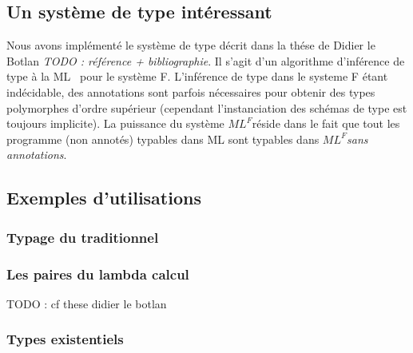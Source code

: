\documentclass[a4paper]{article}
\def\mlf{$ML^F$}
\begin{document}
\subsection{Un système de type intéressant}

Nous avons implémenté le système de type décrit dans la thése de
Didier le Botlan \textit{TODO : référence + bibliographie}. Il s'agit
d'un algorithme d'inférence de type \og à la ML \fg~pour le système F.
L'inférence de type dans le systeme F étant indécidable, des
annotations sont parfois nécessaires pour obtenir des types polymorphes
d'ordre supérieur (cependant l'instanciation des schémas de type est
toujours implicite). La puissance du système \mlf réside dans le fait
que tout les programme (non annotés) typables dans ML sont typables
dans \mlf \emph{sans annotations}.

\subsection{Exemples d'utilisations}

\subsubsection{Typage du traditionnel}

\subsubsection{Les paires du lambda calcul}
TODO : cf these didier le botlan

\subsubsection{Types existentiels}
\end{document}
